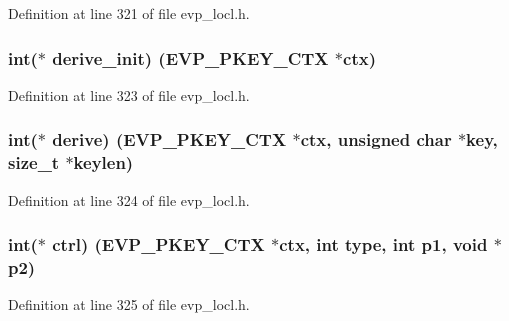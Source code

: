 Definition at line 321 of file evp\+\_\+locl.\+h.

\subsubsection[{\texorpdfstring{derive\+\_\+init}{derive_init}}]{\setlength{\rightskip}{0pt plus 5cm}int($\ast$ derive\+\_\+init) ({\bf E\+V\+P\+\_\+\+P\+K\+E\+Y\+\_\+\+C\+TX} $\ast$ctx)}\hypertarget{structevp__pkey__method__st_a82c46287482e35cbf13acf8c695c5a12}{}\label{structevp__pkey__method__st_a82c46287482e35cbf13acf8c695c5a12}


Definition at line 323 of file evp\+\_\+locl.\+h.

\subsubsection[{\texorpdfstring{derive}{derive}}]{\setlength{\rightskip}{0pt plus 5cm}int($\ast$ derive) ({\bf E\+V\+P\+\_\+\+P\+K\+E\+Y\+\_\+\+C\+TX} $\ast$ctx, unsigned char $\ast$key, size\+\_\+t $\ast$keylen)}\hypertarget{structevp__pkey__method__st_a7542398d84afdc686c9ddfc222f16810}{}\label{structevp__pkey__method__st_a7542398d84afdc686c9ddfc222f16810}


Definition at line 324 of file evp\+\_\+locl.\+h.

\subsubsection[{\texorpdfstring{ctrl}{ctrl}}]{\setlength{\rightskip}{0pt plus 5cm}int($\ast$ ctrl) ({\bf E\+V\+P\+\_\+\+P\+K\+E\+Y\+\_\+\+C\+TX} $\ast$ctx, int {\bf type}, int p1, {\bf void} $\ast$p2)}\hypertarget{structevp__pkey__method__st_a0f35ba06140f666e4d4a20d50434e4c9}{}\label{structevp__pkey__method__st_a0f35ba06140f666e4d4a20d50434e4c9}


Definition at line 325 of file evp\+\_\+locl.\+h.


